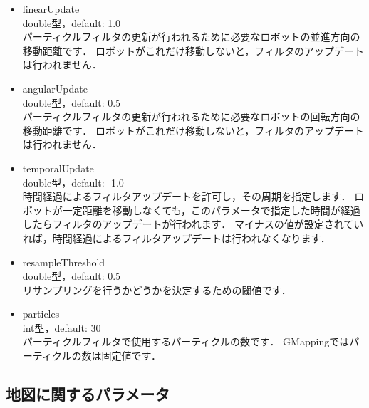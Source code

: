 \documentclass[{../../master}]{subfiles}
\begin{document}
\begin{itemize}
  \item \textsf{linearUpdate} \\
    double型，default: 1.0 \\
    パーティクルフィルタの更新が行われるために必要なロボットの並進方向の移動距離です．
    ロボットがこれだけ移動しないと，フィルタのアップデートは行われません．
  \item \textsf{angularUpdate} \\
    double型，default: 0.5 \\
    パーティクルフィルタの更新が行われるために必要なロボットの回転方向の移動距離です．
    ロボットがこれだけ移動しないと，フィルタのアップデートは行われません．
  \item \textsf{temporalUpdate} \\
    double型，default: -1.0 \\
    時間経過によるフィルタアップデートを許可し，その周期を指定します．
    ロボットが一定距離を移動しなくても，このパラメータで指定した時間が経過したらフィルタのアップデートが行われます．
    マイナスの値が設定されていれば，時間経過によるフィルタアップデートは行われなくなります．
  \item \textsf{resampleThreshold} \\
    double型，default: 0.5 \\
    リサンプリングを行うかどうかを決定するための閾値です．
  \item \textsf{particles} \\
    int型，default: 30 \\
    パーティクルフィルタで使用するパーティクルの数です．
    GMappingではパーティクルの数は固定値です．
\end{itemize}

\subsection{地図に関するパラメータ}
\end{document}
